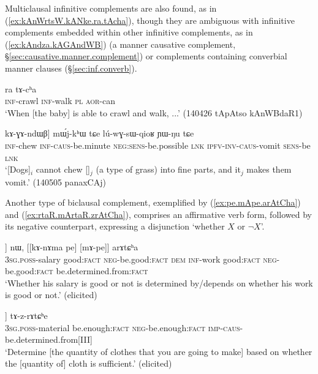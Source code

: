 Multiclausal infinitive complements are also found, as in (\ref{ex:kAnWrtsW.kANke.ra.tAcha}), though they are ambiguous with infinitive complements embedded within other infinitive complements, as in (\ref{ex:kAndza.kAGAndWB}) (a manner causative complement, §\ref{sec:causative.manner.complement}) or complements containing converbial manner clauses (§\ref{sec:inf.converb}).


\begin{exe}
\ex \label{ex:kAnWrtsW.kANke.ra.tAcha}
\gll [kɤ-nɯrtsɯ] [kɤ-ŋke] ra tɤ-cʰa \\
\textsc{inf}-crawl \textsc{inf}-walk \textsc{pl} \textsc{aor}-can \\
\glt `When [the baby] is able to crawl and walk, ...' (140426 tApAtso kAnWBdaR1)
\end{exe} 

\begin{exe}
\ex \label{ex:kAndza.kAGAndWB}
\gll [[kɤ-ndza] kɤ-ɣɤ-ndɯβ] mɯ́j-kʰɯ tɕe lú-wɣ-sɯ-qioʁ ɲɯ-ŋu tɕe \\
\textsc{inf}-chew \textsc{inf}-\textsc{caus}-be.minute \textsc{neg}:\textsc{sens}-be.possible \textsc{lnk} \textsc{ipfv}-\textsc{inv}-\textsc{caus}-vomit \textsc{sens}-be \textsc{lnk} \\
\glt `[Dogs]$_i$ cannot chew []$_j$ (a type of grass) into fine parts, and it$_j$ makes them vomit.' (140505 panaxCAj)
\end{exe} 

Another type of biclausal complement, exemplified by (\ref{ex:pe.mApe.arAtCha}) and (\ref{ex:rtaR.mArtaR.zrAtCha}), comprises an affirmative verb form, followed by its negative counterpart, expressing a disjunction `whether $X$ or $\lnot X$'.

\begin{exe} 
\ex \label{ex:pe.mApe.arAtCha}
\gll  [[ɯ-ngra pe] [mɤ-pe]] nɯ, [[kɤ-nɤma pe] [mɤ-pe]] arɤtɕʰa \\
\textsc{3sg}.\textsc{poss}-salary good:\textsc{fact} \textsc{neg}-be.good:\textsc{fact} \textsc{dem} \textsc{inf}-work good:\textsc{fact} \textsc{neg}-be.good:\textsc{fact} be.determined.from:\textsc{fact} \\
\glt `Whether his salary is good or not is determined by/depends on whether his work is good or not.' (elicited)
\end{exe} 

\begin{exe} 
\ex \label{ex:rtaR.mArtaR.zrAtCha}
\gll  [[ɯ-spa rtaʁ] [mɤ-rtaʁ]] tɤ-z-rɤtɕʰe \\
\textsc{3sg}.\textsc{poss}-material be.enough:\textsc{fact} \textsc{neg}-be.enough:\textsc{fact} \textsc{imp}-\textsc{caus}-be.determined.from[III] \\
\glt `Determine [the quantity of clothes that you are going to make] based on whether the [quantity of] cloth is sufficient.' (elicited)
\end{exe}

